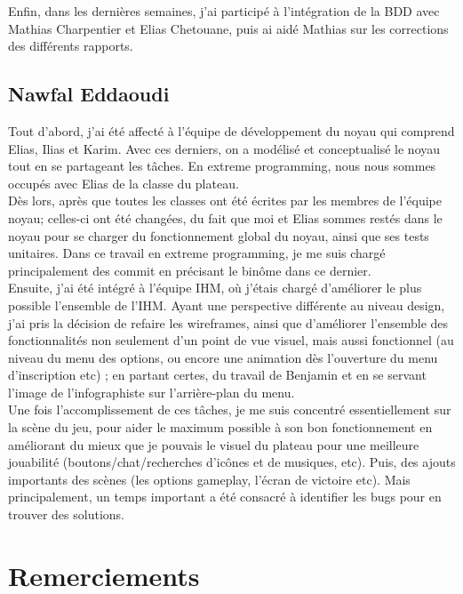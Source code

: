 \documentclass[a4paper,11pt]{article}
\begin{document}
Enfin, dans les dernières semaines, j’ai participé à l’intégration de la BDD avec Mathias Charpentier et Elias Chetouane, puis ai aidé Mathias sur les corrections des différents rapports. \\

\subsection{Nawfal Eddaoudi}

Tout d'abord, j'ai été affecté à l'équipe de développement du noyau qui comprend Elias, Ilias et Karim. Avec ces derniers, on a modélisé et conceptualisé le noyau tout en se partageant les tâches. En extreme programming, nous nous sommes occupés avec Elias de la classe du plateau. \\

Dès lors, après que toutes les classes ont été écrites par les membres de l'équipe noyau; celles-ci ont été changées, du fait que moi et Elias sommes restés dans le noyau pour se charger du fonctionnement global du noyau, ainsi que ses tests unitaires. Dans ce travail en extreme programming, je me suis chargé principalement des commit en précisant le binôme dans ce dernier. \\

Ensuite, j'ai été intégré à l'équipe IHM, où j'étais chargé d'améliorer le plus possible l'ensemble de l'IHM. Ayant une perspective différente au niveau design, j'ai pris la décision de refaire les wireframes, ainsi que d'améliorer l'ensemble des fonctionnalités non seulement d'un point de vue visuel, mais aussi fonctionnel (au niveau du menu des options, ou encore une animation dès l'ouverture du menu d'inscription etc) ;  en partant certes, du travail de Benjamin et en se servant l'image de l'infographiste sur l'arrière-plan du menu. \\

Une fois l'accomplissement de ces tâches, je me suis concentré essentiellement sur la scène du jeu, pour aider le maximum possible à son bon fonctionnement en améliorant du mieux que je pouvais le visuel du plateau pour une meilleure jouabilité (boutons/chat/recherches d'icônes et de musiques, etc). Puis, des ajouts importants des scènes (les options gameplay, l'écran de victoire etc). Mais principalement, un temps important a été consacré à identifier les bugs pour en trouver des solutions.\\


\newpage

\section{Remerciements}
\end{document}
